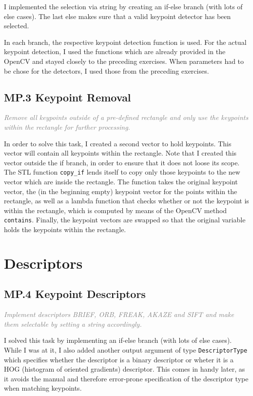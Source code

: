 \documentclass[a4paper]{scrartcl}
\begin{document}
I implemented the selection via string by creating an if-else branch (with lots of else cases).
The last else makes sure that a valid keypoint detector has been selected.

In each branch, the respective keypoint detection function is used.
For the actual keypoint detection, I used the functions which are already provided in the OpenCV
and stayed closely to the preceding exercises.
When parameters had to be chose for the detectors, I used those from the preceding exercises.

\subsection*{MP.3 Keypoint Removal}
\textcolor{gray}{\textit{Remove all keypoints outside of a pre-defined rectangle and only use the keypoints within the rectangle for further processing.}}

In order to solve this task, I created a second vector to hold keypoints.
This vector will contain all keypoints within the rectangle.
Note that I created this vector outside the if branch, in order to ensure that it does not
loose its scope.
The STL function \texttt{copy\_if} lends itself to copy only those keypoints to the new vector
which are inside the rectangle.
The function takes the original keypoint vector, the (in the beginning empty) keypoint vector
for the points within the rectangle, as well as a lambda function that checks whether or
not the keypoint is within the rectangle, which is computed by means of the OpenCV method \texttt{contains}.
Finally, the keypoint vectors are swapped so that the original variable holds the keypoints
within the rectangle.

\section*{Descriptors}
\subsection*{MP.4 Keypoint Descriptors}
\textcolor{gray}{\textit{Implement descriptors BRIEF, ORB, FREAK, AKAZE and SIFT and make them selectable by setting a string accordingly.}}

I solved this task by implementing an if-else branch (with lots of else cases).
While I was at it, I also added another output argument of type \texttt{DescriptorType}
which specifies whether the descriptor is a binary descriptor or wheter it is a HOG
(histogram of oriented gradients) descriptor.
This comes in handy later, as it avoids the manual and therefore error-prone specification
of the descriptor type when matching keypoints.
\end{document}
